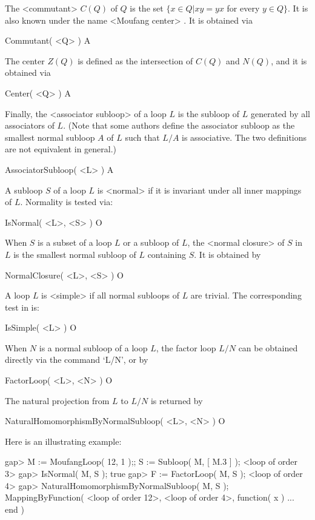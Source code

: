 The <commutant>
%
%
 $C(Q)$ of $Q$ is the set $\{x\in Q| xy=yx$
for every $y\in Q\}$. It is also known under the name <Moufang center>
%
%
.
It is obtained via

\>Commutant( <Q> ) A

The center $Z(Q)$ is defined as the intersection of $C(Q)$ and $N(Q)$, and it
is obtained via

\>Center( <Q> ) A

Finally, the <associator subloop>
%
%
 of a loop $L$ is the subloop of $L$
generated by all associators of $L$. (Note that some authors define the
associator subloop as the smallest normal subloop $A$ of $L$ such that $L/A$ is
associative. The two definitions are not equivalent in general.)

\>AssociatorSubloop( <L> )  A


A subloop $S$ of a loop $L$ is <normal> if it is
invariant under all inner mappings of $L$. Normality is tested via:

\>IsNormal( <L>, <S> ) O

When $S$ is a subset of a loop $L$ or a subloop of $L$, the <normal closure>
%
%
 of $S$ in $L$ is the smallest normal subloop of $L$ containing $S$. It
is obtained by

\>NormalClosure( <L>, <S> ) O

A loop $L$ is <simple> if all normal subloops of $L$ are
trivial. The corresponding test in {\LOOPS} is:

\>IsSimple( <L> ) O


When $N$ is a normal subloop of a loop $L$, the factor loop $L/N$ can be
obtained directly via the command `L/N', or by

\>FactorLoop( <L>, <N> ) O

The natural projection from $L$ to $L/N$ is returned by

\>NaturalHomomorphismByNormalSubloop( <L>, <N> ) O

Here is an illustrating example:

\beginexample
gap> M := MoufangLoop( 12, 1 );; S := Subloop( M, [ M.3 ] );
<loop of order 3>
gap> IsNormal( M, S );
true
gap> F := FactorLoop( M, S );
<loop of order 4>
gap> NaturalHomomorphismByNormalSubloop( M, S );
MappingByFunction( <loop of order 12>, <loop of order 4>,
    function( x ) ... end )
\endexample

